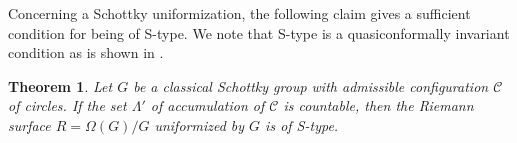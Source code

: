 \documentclass[12pt]{amsart}
\theoremstyle{plain}
\newtheorem{thm}{Theorem}[section]
\begin{document}
%

Concerning a Schottky uniformization, 
the following claim gives a sufficient condition for being of S-type.
We note that S-type is a quasiconformally invariant condition as is shown in \cite[Th.3]{MS}.

\begin{thm}\label{S-type}
Let $G$ be a  classical Schottky group 
with admissible configuration $\mathcal{C}$ of circles.
If the set $\Lambda'$ of accumulation of $\mathcal{C}$ is countable, then
the Riemann surface $R=\Omega(G)/G$ uniformized by $G$ is of S-type.
\end{thm}
\end{document}
